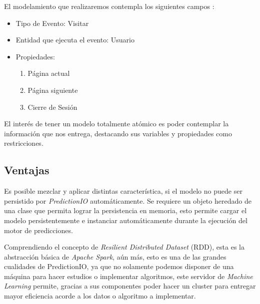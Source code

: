 
  El modelamiento que realizaremos contempla los siguientes campos :


    \begin{itemize}
    		\setlength{\itemsep}{1pt}
    		\setlength{\parskip}{0pt}
    		\setlength{\parsep}{0pt}
      \item Tipo de Evento: Visitar
      \item Entidad que ejecuta el evento: Usuario
      \item Propiedades:
          \begin{enumerate}
          		\setlength{\itemsep}{1pt}
          		\setlength{\parskip}{0pt}
          		\setlength{\parsep}{0pt}
            \item Página actual
            \item Página siguiente
            \item Cierre de Sesión
          \end{enumerate}
    \end{itemize}



    El interés de tener un modelo totalmente atómico es poder contemplar la información que nos entrega, destacando sus variables y propiedades como restricciones.



\subsection{Ventajas }


  Es posible mezclar y aplicar distintas característica, si el modelo no puede ser persistido por \emph{PredictionIO} automáticamente. Se requiere un objeto  heredado de una clase que permita lograr la persistencia en memoria, esto permite cargar el modelo persistentemente e instanciar automáticamente durante la ejecución del motor de predicciones.



  Comprendiendo el concepto de \emph{Resilient Distributed Dataset} (RDD), esta es la abstracción básica de \emph{Apache Spark}, aún más, esto es una de las grandes cualidades de PredictionIO, ya que no solamente podemos disponer de una máquina para hacer estudios o implementar algoritmos, este servidor de \emph{Machine Learning} permite, gracias a sus componentes poder hacer un cluster para entregar mayor eficiencia acorde a los datos o algoritmo a implementar.

